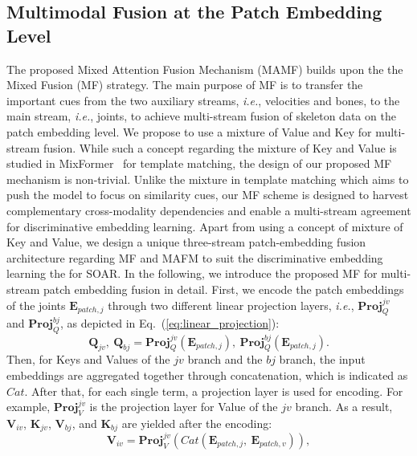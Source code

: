 \documentclass[lettersize,journal]{IEEEtran}
\begin{document}
\subsection{Multimodal Fusion at the Patch Embedding Level}
\label{sec:MAFM}
The proposed Mixed Attention Fusion Mechanism (MAMF) builds upon the the Mixed Fusion (MF) strategy.
The main purpose of MF is to transfer the important cues from the two auxiliary streams, \textit{i.e.}, velocities and bones, to the main stream, \textit{i.e.}, joints, to achieve multi-stream fusion of skeleton data on the patch embedding level. We propose to use a mixture of Value and Key for multi-stream fusion. While such a concept regarding the mixture of Key and Value is studied in MixFormer~\cite{cui2022mixformer} for template matching, the design of our proposed MF mechanism is non-trivial. Unlike the mixture in template matching which aims to push the model to focus on similarity cues, our MF scheme is designed to harvest complementary cross-modality dependencies and enable a multi-stream agreement for discriminative embedding learning. Apart from using a concept of mixture of Key and Value, we design a unique three-stream patch-embedding fusion architecture regarding MF and MAFM to suit the discriminative embedding learning the for SOAR.
In the following, we introduce the proposed MF for multi-stream patch embedding fusion in detail.
First, we encode the patch embeddings of the joints $\mathbf{E}_{patch,j}$ through two different linear projection layers, \textit{i.e.}, $\mathbf{Proj}_{Q}^{jv}$ and $\mathbf{Proj}_{Q}^{bj}$, as depicted in Eq.~(\ref{eq:linear_projection}):
\begin{equation}\label{eq:linear_projection}
    \mathbf{Q}_{jv},~\mathbf{Q}_{bj} = \mathbf{Proj}_{Q}^{jv}(\mathbf{E}_{patch,j}),~\mathbf{Proj}_{Q}^{bj}(\mathbf{E}_{patch,j}).
\end{equation}
Then, for Keys and Values of the $jv$ branch and the $bj$ branch, the input embeddings are aggregated together through concatenation, which is indicated as $Cat$.
After that, for each single term, a projection layer is used for encoding.
For example, $\mathbf{Proj}_{V}^{jv}$ is the projection layer for Value of the $jv$ branch.
As a result, $\mathbf{V}_{iv}$, $\mathbf{K}_{jv}$, $\mathbf{V}_{bj}$, and $\mathbf{K}_{bj}$ are yielded after the encoding:
\begin{equation}
    \mathbf{V}_{iv} = \mathbf{Proj}_{V}^{jv}(Cat(\mathbf{E}_{patch,j},~ \mathbf{E}_{patch,v})),
\end{equation}
\end{document}
